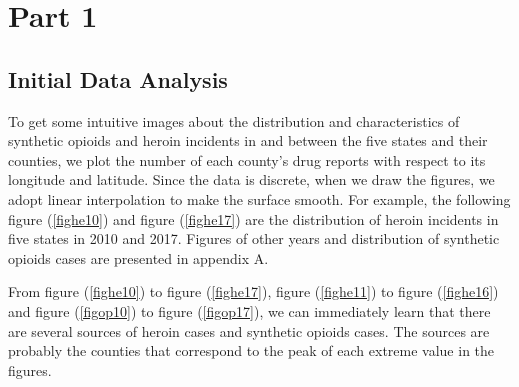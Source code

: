 \documentclass{mcmthesis}
\numberwithin{equation}{section}
\numberwithin{figure}{section}
\numberwithin{table}{section}
\theoremstyle{mydef}
\begin{document}
\section{Part 1}

\subsection{Initial Data Analysis}

To get some intuitive images about the distribution and characteristics of synthetic opioids and heroin incidents in and between the five states and their counties, we plot the number of each county's drug reports with respect to its longitude and latitude. Since the data is discrete, when we draw the figures, we adopt linear interpolation to make the surface smooth. For example, the following figure (\ref{fighe10}) and figure (\ref{fighe17}) are the distribution of heroin incidents in five states in 2010 and 2017. Figures of other years and distribution of synthetic opioids  cases are presented in appendix A.

From figure (\ref{fighe10}) to figure (\ref{fighe17}), figure (\ref{fighe11}) to figure (\ref{fighe16}) and figure (\ref{figop10}) to figure (\ref{figop17}), we can immediately learn that there are several sources of heroin cases and synthetic opioids cases. The sources are probably the counties that correspond to the peak of each extreme value in the figures.
\end{document}
